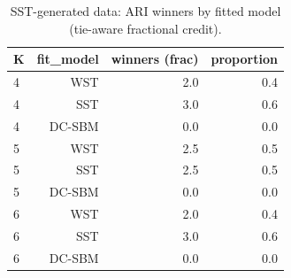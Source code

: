 \begin{table}[!h]
\centering
\caption{SST-generated data: ARI winners by fitted model (tie-aware fractional credit).\\\label{tab:sst-appx-ari-winners}}
\centering
\begin{tabular}[t]{lrrr}
\toprule
K & fit_model & winners (frac) & proportion\\
\midrule
4 & WST & 2.0 & 0.4\\
4 & SST & 3.0 & 0.6\\
4 & DC-SBM & 0.0 & 0.0\\
5 & WST & 2.5 & 0.5\\
5 & SST & 2.5 & 0.5\\
5 & DC-SBM & 0.0 & 0.0\\
6 & WST & 2.0 & 0.4\\
6 & SST & 3.0 & 0.6\\
6 & DC-SBM & 0.0 & 0.0\\
\bottomrule
\end{tabular}
\end{table}
